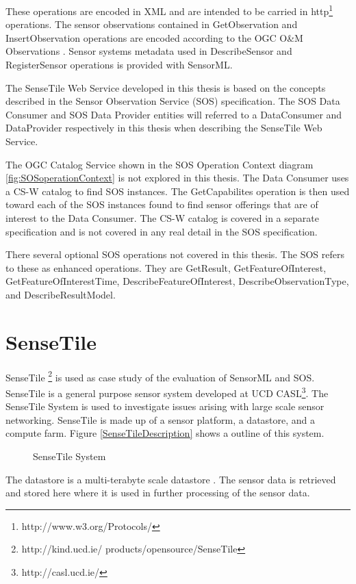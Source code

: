\documentclass[]{final_report}
\begin{document}
These operations are encoded in XML and are intended to be carried in http\footnote{http://www.w3.org/Protocols/}  operations. The sensor observations contained in GetObservation and InsertObservation operations are encoded according to the OGC O\&M Observations \cite{OMref}. Sensor systems metadata used in DescribeSensor and RegisterSensor operations is provided with SensorML.

The SenseTile Web Service developed in this thesis is based on the concepts described in the Sensor Observation Service (SOS) specification. The SOS Data Consumer and SOS Data Provider entities will referred to a DataConsumer and DataProvider respectively in this thesis when describing the SenseTile Web Service.
 
The OGC Catalog Service shown in the SOS Operation Context diagram \ref{fig:SOSoperationContext} is not explored in this thesis. The Data Consumer uses a CS-W catalog to find SOS instances. The GetCapabilites operation is then used toward each of the SOS instances found to find sensor offerings that are of interest to the Data Consumer. The CS-W catalog is covered in a separate specification \cite{OGCcatref} and is not covered in any real detail in the SOS specification. 

There several optional SOS operations not covered in this thesis. The SOS refers to these as enhanced operations. They are GetResult, GetFeatureOfInterest, GetFeatureOfInterestTime, DescribeFeatureOfInterest, DescribeObservationType, and DescribeResultModel. 


\section{SenseTile}
SenseTile \footnote{http://kind.ucd.ie/
products/opensource/SenseTile} is used as case study of the evaluation of SensorML and SOS. SenseTile is a general purpose sensor system developed at UCD CASL\footnote{http://casl.ucd.ie/}. The SenseTile System is used to investigate issues arising with large scale sensor networking. SenseTile is made up of a sensor platform, a datastore, and a compute farm. Figure \ref{SenseTileDescription} shows a outline of this system. 
\begin{figure}[h]
\centering
{}
\caption{SenseTile System}\label{fig:SenseTileDescription}
\end{figure}
\newpage

The datastore is a multi-terabyte scale datastore . The sensor data is retrieved and stored here where it is used in further processing of the sensor data.
\end{document}
